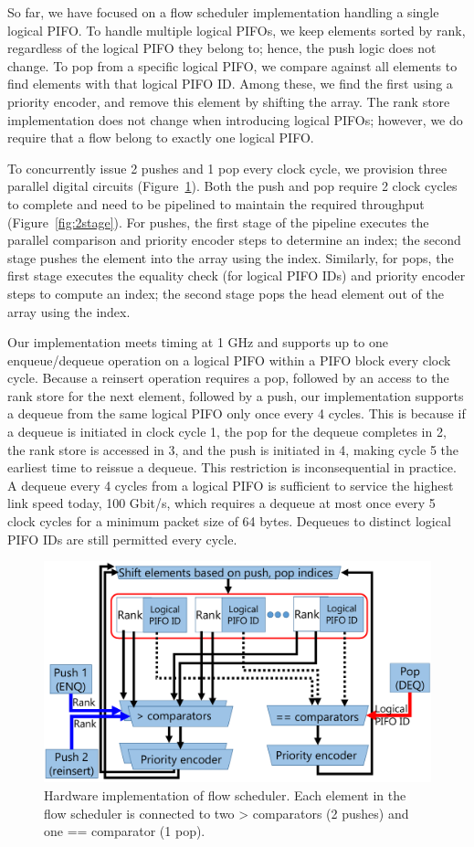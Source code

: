 So far, we have focused on a flow scheduler implementation handling a single
logical PIFO. To handle multiple logical PIFOs, we keep elements sorted by
rank, regardless of the logical PIFO they belong to; hence, the push logic
does not change.  To pop from a specific logical PIFO, we compare against all
elements to find elements with that logical PIFO ID. Among these, we find the
first using a priority encoder, and remove this element by shifting the array.
The rank store implementation does not change when introducing logical PIFOs;
however, we do require that a flow belong to exactly one logical PIFO.

To concurrently issue 2 pushes and 1 pop every clock cycle, we provision three
parallel digital circuits (Figure~\ref{fig:flow_scheduler}). Both the
push and pop require 2 clock cycles to complete and need to be pipelined
 to maintain the required throughput (Figure~\ref{fig:2stage}). For pushes, the first stage of the pipeline executes
the parallel comparison and priority encoder steps to determine an index; the
second stage pushes the element into the array using the index.  Similarly, for
pops, the first stage executes the equality check (for logical PIFO IDs) and
priority encoder steps to compute an index; the second stage pops the head
element out of the array using the index.

Our implementation meets timing at 1 GHz and supports up to one enqueue/dequeue
operation on a logical PIFO within a PIFO block every clock cycle. Because a
reinsert operation requires a pop, followed by an access to the rank store for
the next element, followed by a push, our implementation supports a dequeue
from the same logical PIFO only once every 4 cycles. This is because if a dequeue is initiated
in clock cycle 1, the pop for the dequeue completes in 2, the rank store is accessed in 3, and
the push is initiated in 4, making cycle 5 the earliest time to reissue a dequeue.
This restriction is inconsequential in practice.  A dequeue every 4 cycles from
a logical PIFO is sufficient to service the highest link speed today, 100
Gbit/s, which requires a dequeue at most once every 5 clock cycles for a
minimum packet size of 64 bytes. Dequeues to distinct logical PIFO IDs are
still permitted every cycle.

\begin{figure}[!t]
  \centering
  \includegraphics[width=0.6\columnwidth]{pifo_flow_scheduler_hardware.pdf}
  \caption{Hardware implementation of flow scheduler. Each element in the flow
  scheduler is connected to two > comparators (2 pushes) and one == comparator (1
  pop).}
  \label{fig:flow_scheduler}
\end{figure}

